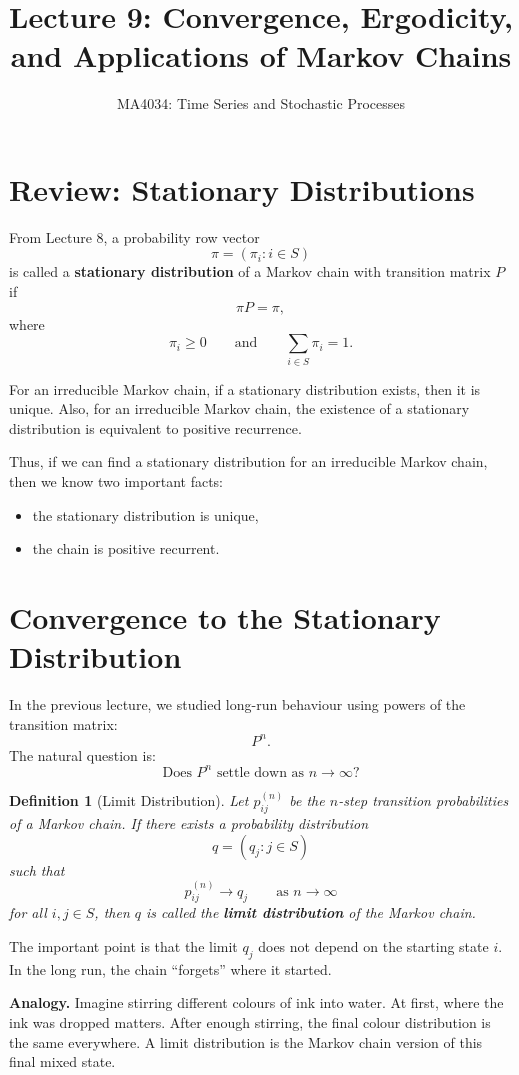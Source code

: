 \documentclass[12pt,a4paper]{article}
\title{\textbf{Lecture 9: Convergence, Ergodicity, and Applications of Markov Chains}}
\author{MA4034: Time Series and Stochastic Processes}
\date{}
\theoremstyle{lecturestyle}
\newtheorem{definition}{Definition}
\begin{document}
\maketitle

\section{Review: Stationary Distributions}

From Lecture 8, a probability row vector
\[
\pi=(\pi_i:i\in S)
\]
is called a \textbf{stationary distribution} of a Markov chain with transition matrix $P$ if
\[
\pi P=\pi,
\]
where
\[
\pi_i\geq 0
\qquad\text{and}\qquad
\sum_{i\in S}\pi_i=1.
\]

For an irreducible Markov chain, if a stationary distribution exists, then it is unique. Also, for an irreducible Markov chain, the existence of a stationary distribution is equivalent to positive recurrence.

Thus, if we can find a stationary distribution for an irreducible Markov chain, then we know two important facts:
\begin{itemize}[leftmargin=1.2cm]
    \item the stationary distribution is unique,
    \item the chain is positive recurrent.
\end{itemize}

\section{Convergence to the Stationary Distribution}

In the previous lecture, we studied long-run behaviour using powers of the transition matrix:
\[
P^n.
\]
The natural question is:
\[
\text{Does }P^n\text{ settle down as }n\to\infty?
\]

\begin{definition}[Limit Distribution]
Let $p_{ij}^{(n)}$ be the $n$-step transition probabilities of a Markov chain. If there exists a probability distribution
\[
q=(q_j:j\in S)
\]
such that
\[
p_{ij}^{(n)}\to q_j
\qquad\text{as }n\to\infty
\]
for all $i,j\in S$, then $q$ is called the \textbf{limit distribution} of the Markov chain.
\end{definition}

The important point is that the limit $q_j$ does not depend on the starting state $i$. In the long run, the chain ``forgets'' where it started.

\textbf{Analogy.} Imagine stirring different colours of ink into water. At first, where the ink was dropped matters. After enough stirring, the final colour distribution is the same everywhere. A limit distribution is the Markov chain version of this final mixed state.
\end{document}
